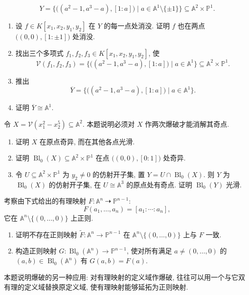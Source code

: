 \begin{BookExercises}
  \[
    Y=\{\bigl((a^{2}-1,a^{3}-a),[1:a]\bigr)\mid a\in\mathbb{A}^{1}\setminus\{\pm1\}\}
    \subseteq\mathbb{A}^{2}\times\mathbb{P}^{1}.
  \]
  \begin{enumerate}
    \item 设 $f\in K[x_{1},x_{2},y_{1},y_{2}]$ 在 $Y$ 的每一点处消没. 证明 $f$ 也在两点 $\bigl((0,0),[1:\pm1]\bigr)$ 处消没.
    \item 找出三个多项式 $f_{1},f_{2},f_{3}\in K[x_{1},x_{2},y_{1},y_{2}]$, 使
    \[
      \mathcal{V}(f_{1},f_{2},f_{3})
      =\{\bigl((a^{2}-1,a^{3}-a),[1:a]\bigr)\mid a\in\mathbb{A}^{1}\}
        \subseteq\mathbb{A}^{2}\times\mathbb{P}^{1}.
    \]
    \item 推出
    \[
      \overline{Y}=\{\bigl((a^{2}-1,a^{3}-a),[1:a]\bigr)\mid a\in\mathbb{A}^{1}\}.
    \]
    \item 证明 $\overline{Y}\cong\mathbb{A}^{1}$.
  \end{enumerate}
  \item\label{ex:two-blowups-resolve-higher-cusp} 令 $X=\mathcal{V}(x_{1}^{2}-x_{2}^{5})\subseteq\mathbb{A}^{2}$. 本题说明必须对 $X$ 作两次爆破才能消解其奇点.
  \begin{enumerate}
    \item 证明 $X$ 在原点奇异, 而在其他各点光滑.
    \item 证明 $\operatorname{Bl}_{0}(X)\subseteq\mathbb{A}^{2}\times\mathbb{P}^{1}$ 在点 $\bigl((0,0),[0:1]\bigr)$ 处奇异.
    \item 令 $U\subseteq\mathbb{A}^{2}\times\mathbb{P}^{1}$ 为 $y_{2}\ne0$ 的仿射开子集, 置 $Y=U\cap\operatorname{Bl}_{0}(X)$. 则 $Y$ 为 $\operatorname{Bl}_{0}(X)$ 的仿射开子集, 在 $U\cong\mathbb{A}^{3}$ 的原点处有奇点. 证明 $\operatorname{Bl}_{0}(Y)$ 光滑.
  \end{enumerate}
  \item\label{ex:blowup-extends-direction-map-to-regular-map} 考察由下式给出的有理映射 $F:\mathbb{A}^{n}\mathrel{\rightdasharrow}\mathbb{P}^{n-1}$:
  \[
    F(a_{1},\ldots,a_{n})=[a_{1}:\cdots:a_{n}],
  \]
  它在 $\mathbb{A}^{n}\setminus\{(0,\ldots,0)\}$ 上正则.
  \begin{enumerate}
    \item 证明不存在正则映射 $\widetilde{F}:\mathbb{A}^{n}\to\mathbb{P}^{n-1}$ 在 $\mathbb{A}^{n}\setminus\{(0,\ldots,0)\}$ 上与 $F$ 一致.
    \item 构造正则映射 $G:\operatorname{Bl}_{0}(\mathbb{A}^{n})\to\mathbb{P}^{n-1}$, 使对所有满足 $a\ne(0,\ldots,0)$ 的 $(a,b)\in\operatorname{Bl}_{0}(\mathbb{A}^{n})$ 有 $G(a,b)=F(a)$.
  \end{enumerate}
  本题说明爆破的另一种应用: 对有理映射的定义域作爆破, 往往可以用一个与它双有理的定义域替换原定义域, 使有理映射能够延拓为正则映射.
\end{BookExercises}
